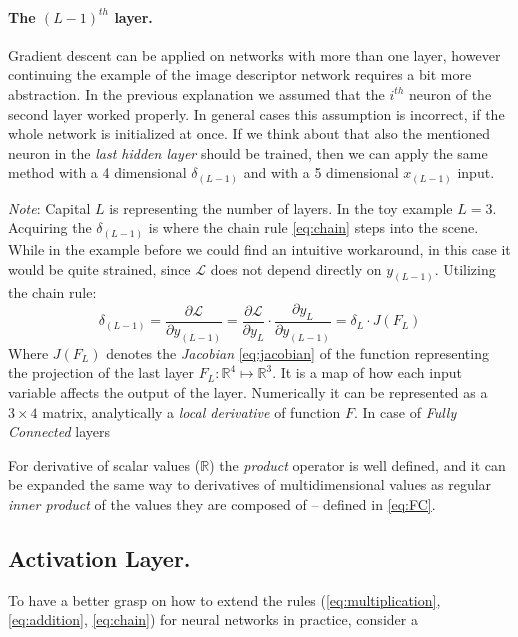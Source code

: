 \paragraph{The $(L-1)^{th}$ layer.} Gradient descent can be applied on networks with more than one layer, 
however continuing the example of the image descriptor network requires a bit more abstraction. 
In the previous explanation we assumed that the $i^{th}$ neuron of the second layer worked properly.
In general cases this assumption is incorrect, if the whole network is initialized at once.
If we think about that also the mentioned neuron in the \emph{last hidden layer} should be trained, 
then we can apply the same method with a 4 dimensional $\delta_{(L-1)}$ and with a 5 dimensional $x_{(L-1)}$ input.

\emph{Note}: Capital $L$ is representing the number of layers. In the toy example $L = 3$.\\
Acquiring the $\delta_{(L-1)}$ is where the chain rule \eqref{eq:chain} steps into the scene.
While in the example before we could find an intuitive workaround, in this case it would be quite strained, since $\mathcal{L}$ does not depend directly on $y_{(L-1)}$.
Utilizing the chain rule:
\begin{equation}
    \delta_{(L-1)} = 
    \frac{\partial \mathcal{L}}{\partial y_{(L-1)}} = 
    \frac{\partial \mathcal{L}}{\partial y_{L}} \cdot
    \frac{\partial y_{L}}{\partial y_{(L-1)}} = 
    \delta_L \cdot J(F_L)
\end{equation}
Where $J(F_L)$ denotes the \emph{Jacobian} \eqref{eq:jacobian} of the function representing the projection of the last layer $F_L:\mathbb{R}^4\mapsto \mathbb{R}^3$.
It is a map of how each input variable affects the output of the layer.
Numerically it can be represented as a $3 \times 4$ matrix, analytically a \emph{local derivative} of function $F$.
In case of \emph{Fully Connected} layers 

For derivative of scalar values ($\mathbb{R}$) the \emph{product} operator is well defined, 
and it can be expanded the same way to derivatives of multidimensional values as 
regular \emph{inner product} of the values they are composed of -- defined in \eqref{eq:FC}.

\subsection{Activation Layer.} To have a better grasp on how to extend the rules (\ref{eq:multiplication}, \ref{eq:addition}, \ref{eq:chain}) for neural networks in practice, consider a 


